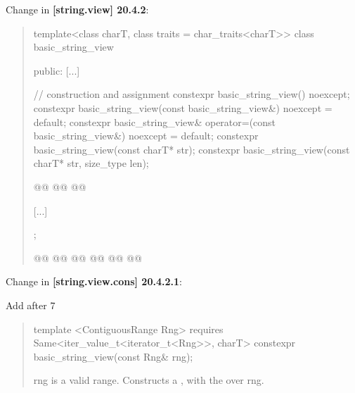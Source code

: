 \documentclass{wg21}
\begin{document}
Change in \textbf{[string.view] 20.4.2}:
\begin{quote}
\begin{codeblock}

template<class charT, class traits = char_traits<charT>>
class basic_string_view {
public:
	[...]
	
	// construction and assignment
	constexpr basic_string_view() noexcept;
	constexpr basic_string_view(const basic_string_view&) noexcept = default;
	constexpr basic_string_view& operator=(const basic_string_view&) noexcept = default;
	constexpr basic_string_view(const charT* str);
	constexpr basic_string_view(const charT* str, size_type len);
	
	@@
	@@
	@@
	
	[...]
};

@@
@@
@@
@@
@@
@\added{\qquad 	>;}@

\end{codeblock}
\end{quote}

Change in \textbf{[string.view.cons] 20.4.2.1}:

Add after 7

\begin{quote}
\begin{addedblock}
\begin{itemdecl}
template <ContiguousRange Rng>
requires Same<iter_value_t<iterator_t<Rng>>, charT>
constexpr basic_string_view(const Rng& rng);
	
\end{itemdecl}

\begin{itemdescr}
	\requires
	rng is a valid range.
	\effects
	Constructs a , with the over  rng.
	
\end{itemdescr}
\end{addedblock}
\end{quote}
\end{document}
